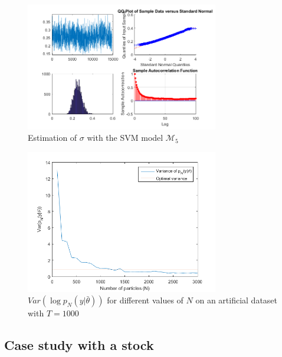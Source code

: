 \documentclass[11pt,a4,twosided,singlespacing,titlepagenumber=on]{scrreprt}
\numberwithin{equation}{chapter} %
\theoremstyle{remark}
\begin{document}
\begin{figure}[htb]
\centering
\includegraphics[width = 0.75\textwidth]{sigma_svm}
\caption{Estimation of $\sigma$ with the SVM model $\mathcal{M}_5$}
\label{sigma_svm}
\end{figure}


\begin{figure}[htb]
\centering
\includegraphics[width = 0.75\textwidth]{tuning_n_optimal_var}
\caption{$Var(\log p_N(y|\bar{\theta}))$ for different values of $N$ on an artificial dataset with $T=1000$}
\label{est_var_pn_theta_n}
\end{figure}

\subsection{Case study with a stock}
\end{document}
